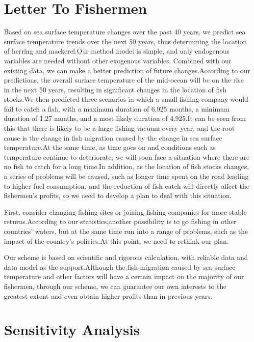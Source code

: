 \documentclass{mcmthesis}
\begin{document}
\section{Letter To Fishermen}%
Based on sea surface temperature changes over the past 40 years, we predict sea surface temperature trends over the next 50 years, thus determining the location of herring and mackerel.Our method model is simple, and only endogenous variables are needed without other exogenous variables. Combined with our existing data, we can make a better prediction of future changes.According to our predictions, the overall surface temperature of the mid-ocean will be on the rise in the next 50 years, resulting in significant changes in the location of fish stocks.We then predicted three scenarios in which a small fishing company would fail to catch a fish, with a maximum duration of 6.925 months, a minimum duration of 1.27 months, and a most likely duration of 4.925.It can be seen from this that there is likely to be a large fishing vacuum every year, and the root cause is the change in fish migration caused by the change in sea surface temperature.At the same time, as time goes on and conditions such as temperature continue to deteriorate, we will soon face a situation where there are no fish to catch for a long time.In addition, as the location of fish stocks changes, a series of problems will be caused, such as longer time spent on the road leading to higher fuel consumption, and the reduction of fish catch will directly affect the fishermen's profits, so we need to develop a plan to deal with this situation.

First, consider changing fishing sites or joining fishing companies for more stable returns.According to our statistics,another possibility is to go fishing in other countries' waters, but at the same time run into a range of problems, such as the impact of the country's policies.At this point, we need to rethink our plan.

Our scheme is based on scientific and rigorous calculation, with reliable data and data model as the support.Although the fish migration caused by sea surface temperature and other factors will have a certain impact on the majority of our fishermen, through our scheme, we can guarantee our own interests to the greatest extent and even obtain higher profits than in previous years.
\newpage
\section{Sensitivity Analysis}
\lipsum[9]
\end{document}
